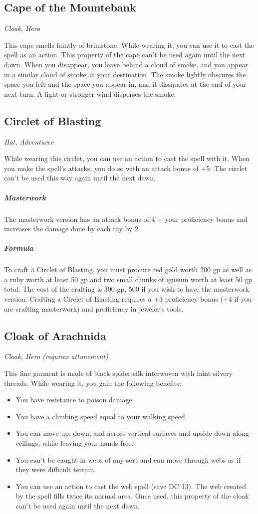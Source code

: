 \subsection{Cape of the Mountebank}
\textit{Cloak, Hero}

This cape smells faintly of brimstone. While wearing it, you can use it to cast the  spell as an action. This property of the cape can't be used again until the next dawn. When you disappear, you leave behind a cloud of smoke, and you appear in a similar cloud of smoke at your destination. The smoke lightly obscures the space you left and the space you appear in, and it dissipates at the end of your next turn. A light or stronger wind disperses the smoke.

\subsection{Circlet of Blasting}
\textit{Hat, Adventurer}

While wearing this circlet, you can use an action to cast the  spell with it. When you make the spell's attacks, you do so with an attack bonus of +5. The circlet can't be used this way again until the next dawn.

\subparagraph*{Masterwork} The masterwork version has an attack bonus of 4 + your proficiency bonus and increases the damage done by each ray by 2.

\subparagraph*{Formula} To craft a Circlet of Blasting, you must procure red gold worth 200 gp as well as a ruby worth at least 50 gp and two small chunks of igneum worth at least 50 gp total. The cost of the crafting is 300 gp, 500 if you wish to have the masterwork version. Crafting a Circlet of Blasting requires a +3 proficiency bonus (+4 if you are crafting masterwork) and proficiency in jeweler's tools.

\subsection{Cloak of Arachnida}
\textit{Cloak, Hero (requires attunement)} 

This fine garment is made of black spider-silk interwoven with faint silvery threads. While wearing it, you gain the following benefits:
\begin{itemize}
 \item You have resistance to poison damage.
 \item You have a climbing speed equal to your walking speed.
 \item You can move up, down, and across vertical surfaces and upside down along ceilings, while leaving your hands free.
 \item You can't be caught in webs of any sort and can move through webs as if they were difficult terrain.
 \item You can use an action to cast the web spell (save DC 13). The web created by the spell fills twice its normal area. Once used, this property of the cloak can't be used again until the next dawn.
\end{itemize}

